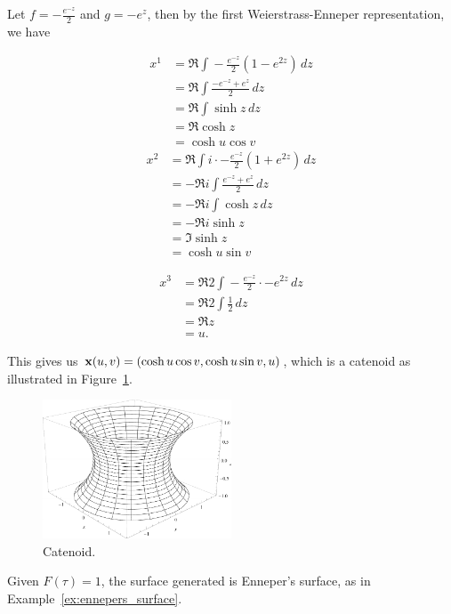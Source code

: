   \newcommand{\zint}[2]{\Re#1\int\!#2\,dz}
  \begin{ex}
    \label{ex:catenoid}
    Let $f = -\frac{e^{-z}}{2}$ and $g = -e^z$, then by the first Weierstrass-Enneper representation, we have
    \begin{multicols}{2}
      \begin{align*}
        x^1 &= \zint{}{-\frac{e^{-z}}{2}\left(1 - e^{2z}\right)}\\
        &= \zint{}{\frac{-e^{-z} + e^z}{2}}\\
        &= \zint{}{\sinh z}\\
        &= \Re\cosh z\\
        &= \cosh u \cos v
      \end{align*}\break
      \begin{align*}
        x^2 &= \zint{}{i\cdot-\frac{e^{-z}}{2}\left(1 + e^{2z}\right)}\\
        &= -\zint{i}{\frac{e^{-z} + e^z}{2}}\\
        &= -\zint{i}{\cosh z}\\
        &= -\Re i\sinh z\\
        &= \Im \sinh z\\
        &= \cosh u \sin v
      \end{align*}
    \end{multicols}
    \begin{align*}
      x^3 &= \zint{2}{-\frac{e^{-z}}{2}\cdot -e^{2z}}\\
      &= \zint{2}{\frac{1}{2}}\\
      &= \Re z\\
      &= u.
    \end{align*}

    This gives us $\mathbf{x}(u, v) = (\cosh u \cos v, \cosh u \sin v, u)$, which is a catenoid as illustrated in Figure~\ref{fig:catenoid}.
    \begin{figure} %
      \centering
      \includegraphics[width=0.5\textwidth]{figures/catenoid.pdf}
      \caption{Catenoid.}
      \label{fig:catenoid}
    \end{figure}
  \end{ex}

  \begin{ex}
    Given $F(\tau) = 1$, the surface generated is Enneper's surface, as in Example~\ref{ex:ennepers_surface}.
  \end{ex}
